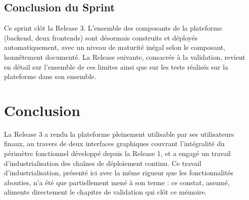 \subsection{Conclusion du Sprint}

Ce sprint clôt la Release 3. L'ensemble des composants de la plateforme (backend, deux frontends) sont désormais construits et déployés automatiquement, avec un niveau de maturité inégal selon le composant, honnêtement documenté. La Release suivante, consacrée à la validation, revient en détail sur l'ensemble de ces limites ainsi que sur les tests réalisés sur la plateforme dans son ensemble.

\section{Conclusion}

La Release 3 a rendu la plateforme pleinement utilisable par ses utilisateurs finaux, au travers de deux interfaces graphiques couvrant l'intégralité du périmètre fonctionnel développé depuis la Release 1, et a engagé un travail d'industrialisation des chaînes de déploiement continu. Ce travail d'industrialisation, présenté ici avec la même rigueur que les fonctionnalités abouties, n'a été que partiellement mené à son terme : ce constat, assumé, alimente directement le chapitre de validation qui clôt ce mémoire.
